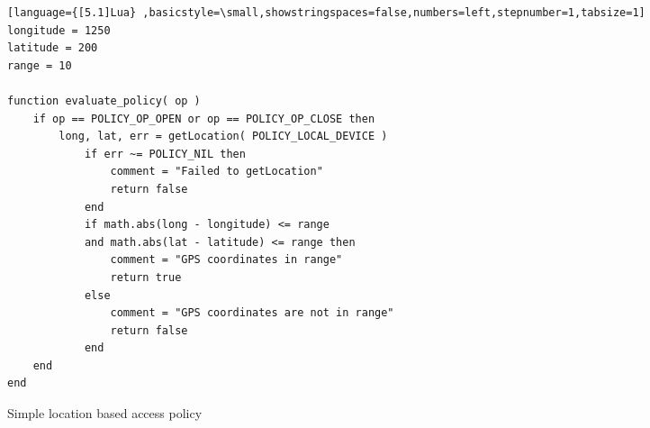 



\begin{figure*}[t]
\begin{lstlisting}[language={[5.1]Lua} ,basicstyle=\small,showstringspaces=false,numbers=left,stepnumber=1,tabsize=1]
longitude = 1250
latitude = 200
range = 10

function evaluate_policy( op )
    if op == POLICY_OP_OPEN or op == POLICY_OP_CLOSE then
        long, lat, err = getLocation( POLICY_LOCAL_DEVICE )
            if err ~= POLICY_NIL then
                comment = "Failed to getLocation"
                return false
            end
            if math.abs(long - longitude) <= range
            and math.abs(lat - latitude) <= range then
                comment = "GPS coordinates in range"
                return true
            else
                comment = "GPS coordinates are not in range"
                return false
            end
    end
end
\end{lstlisting}
\caption{Simple location based access policy}
\label{fig:location_policy}
\end{figure*}


